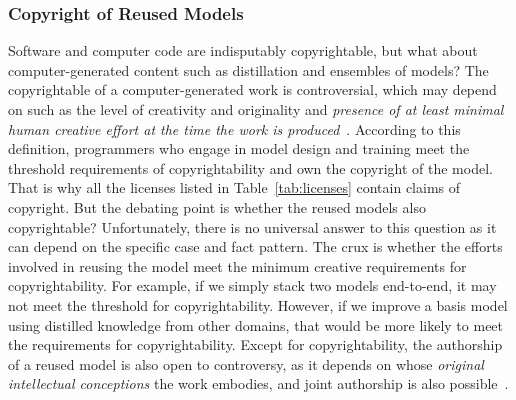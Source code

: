 \subsubsection{Copyright of Reused Models}
\label{sec:generated content}
Software and computer code are indisputably copyrightable, but what about computer-generated content such as distillation and ensembles of models?
The copyrightable of a computer-generated work is controversial, which may depend on such as the level of creativity and originality and \textit{presence of at least minimal human creative effort at the time the work is produced}~\cite{national1979final}.
According to this definition, programmers who engage in model design and training meet the threshold requirements of copyrightability and own the copyright of the model. 
That is why all the licenses listed in Table~\ref{tab:licenses} contain claims of copyright.
But the debating point is whether the reused models also copyrightable?
Unfortunately, there is no universal answer to this question as it can depend on the specific case and fact pattern.
The crux is whether the efforts involved in reusing the model meet the minimum creative requirements for copyrightability.
For example, if we simply stack two models end-to-end, it may not meet the threshold for copyrightability. 
However, if we improve a basis model using distilled knowledge from other domains, that would be more likely to meet the requirements for copyrightability.
Except for copyrightability, the authorship of a reused model is also open to controversy, as it depends on whose \textit{original intellectual conceptions} the work embodies, and joint authorship is also possible~\cite{hedrick2019ithink}.

